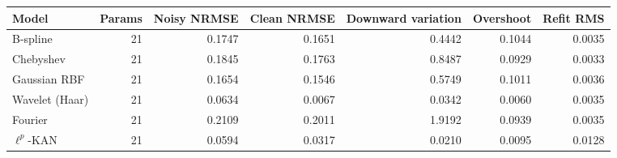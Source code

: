 \begin{tabular}{lrrrrrr}
\toprule
Model & Params & Noisy NRMSE & Clean NRMSE & Downward variation & Overshoot & Refit RMS \\
\midrule
B-spline & 21 & 0.1747 & 0.1651 & 0.4442 & 0.1044 & 0.0035 \\
Chebyshev & 21 & 0.1845 & 0.1763 & 0.8487 & 0.0929 & 0.0033 \\
Gaussian RBF & 21 & 0.1654 & 0.1546 & 0.5749 & 0.1011 & 0.0036 \\
Wavelet (Haar) & 21 & 0.0634 & 0.0067 & 0.0342 & 0.0060 & 0.0035 \\
Fourier & 21 & 0.2109 & 0.2011 & 1.9192 & 0.0939 & 0.0035 \\
$\ell^p$-KAN & 21 & 0.0594 & 0.0317 & 0.0210 & 0.0095 & 0.0128 \\
\bottomrule
\end{tabular}
